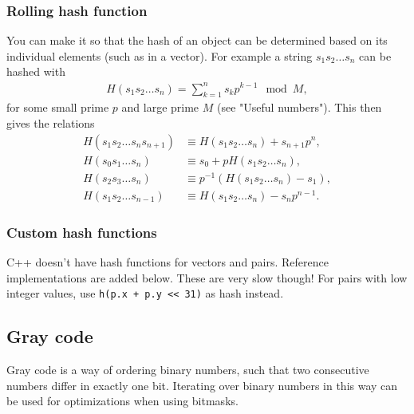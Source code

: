 \subsubsection{Rolling hash function}
You can make it so that the hash of an object can be determined based on its individual elements (such as in a vector). For example a string $s_1s_2\dots s_n$ can be hashed with
\begin{align*}
    H(s_1s_2\dots s_n) = \sum_{k=1}^n s_kp^{k-1}\mod M,
\end{align*}
for some small prime $p$ and large prime $M$ (see "Useful numbers"). This then gives the relations
\begin{align*}
    H(s_1s_2\dots s_ns_{n+1}) &\equiv H(s_1s_2\dots s_n) + s_{n+1}p^{n}, \\
    H(s_0s_1\dots s_n) &\equiv s_0 + pH(s_1s_2\dots s_n), \\
    H(s_2s_3\dots s_n) &\equiv p^{-1}\left(H(s_1s_2\dots s_n) - s_1\right), \\
    H(s_1s_2 \dots s_{n-1}) &\equiv H(s_1s_2\dots s_n) - s_{n}p^{n - 1}.
\end{align*}

\subsubsection{Custom hash functions}
C++ doesn't have hash functions for vectors and pairs. Reference implementations are added below. These are very slow though! For pairs with low integer values, use \texttt{h(p.x + p.y << 31)} as hash instead.







\subsection{Gray code}
Gray code is a way of ordering binary numbers, such that two consecutive numbers differ in exactly one bit. Iterating over binary numbers in this way can be used for optimizations when using bitmasks.





